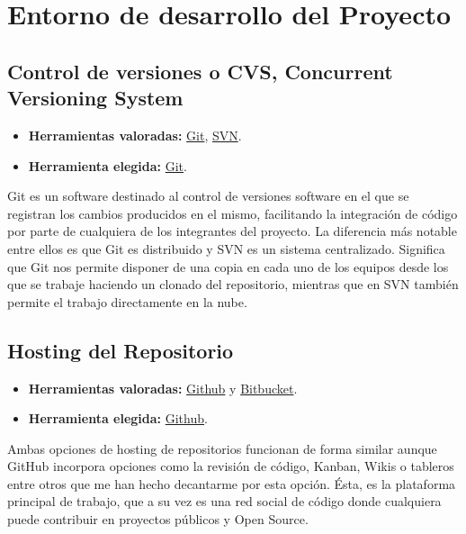 \section{Entorno de desarrollo del Proyecto}

\subsection{Control de versiones o CVS, Concurrent Versioning System}\label{4:controlVersiones}
\begin{itemize}
    \item \textbf{Herramientas valoradas:} \href{https://git-scm.com/}{Git}, \href{https://subversion.apache.org/}{SVN}.
    \item \textbf{Herramienta elegida:} \href{https://git-scm.com/}{Git}.
\end{itemize}

Git es un software destinado al control de versiones software en el que se registran los cambios producidos en el mismo, facilitando la integración de código por parte de cualquiera de los integrantes del proyecto.
La diferencia más notable entre ellos es que Git es distribuido y SVN es un sistema centralizado. Significa que Git nos permite disponer de una copia en cada uno de los equipos desde los que se trabaje haciendo un clonado del repositorio, mientras que en SVN también permite el trabajo directamente en la nube.

\subsection{Hosting del Repositorio}\label{4:GitHUb}
\begin{itemize}
    \item \textbf{Herramientas valoradas:} \href{https://github.com/}{Github} y \href{https://bitbucket.org/product/}{Bitbucket}.
    \item \textbf{Herramienta elegida:} \href{https://github.com/}{Github}.
\end{itemize}

Ambas opciones de hosting de repositorios funcionan de forma similar aunque GitHub incorpora opciones como la revisión de código, Kanban, Wikis o tableros entre otros que me han hecho decantarme por esta opción.
Ésta, es la plataforma principal de trabajo, que a su vez es una red social de código donde cualquiera puede contribuir en proyectos públicos y Open Source.


